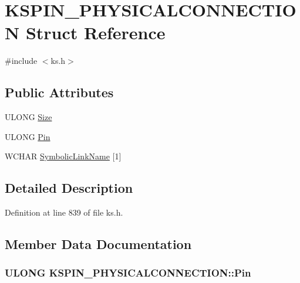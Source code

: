 \hypertarget{struct_k_s_p_i_n___p_h_y_s_i_c_a_l_c_o_n_n_e_c_t_i_o_n}{}\section{K\+S\+P\+I\+N\+\_\+\+P\+H\+Y\+S\+I\+C\+A\+L\+C\+O\+N\+N\+E\+C\+T\+I\+ON Struct Reference}
\label{struct_k_s_p_i_n___p_h_y_s_i_c_a_l_c_o_n_n_e_c_t_i_o_n}


{\ttfamily \#include $<$ks.\+h$>$}

\subsection*{Public Attributes}
\begin{DoxyCompactItemize}
\item 
U\+L\+O\+NG \hyperlink{struct_k_s_p_i_n___p_h_y_s_i_c_a_l_c_o_n_n_e_c_t_i_o_n_a4108d9b16615bd5d9beedaa8974c49a8}{Size}
\item 
U\+L\+O\+NG \hyperlink{struct_k_s_p_i_n___p_h_y_s_i_c_a_l_c_o_n_n_e_c_t_i_o_n_adefc2838105d64b41dfd3fe524b2898c}{Pin}
\item 
W\+C\+H\+AR \hyperlink{struct_k_s_p_i_n___p_h_y_s_i_c_a_l_c_o_n_n_e_c_t_i_o_n_abfc0094a85674a0a8d6bfd943b83cbb7}{Symbolic\+Link\+Name} \mbox{[}1\mbox{]}
\end{DoxyCompactItemize}


\subsection{Detailed Description}


Definition at line 839 of file ks.\+h.



\subsection{Member Data Documentation}
\subsubsection[{\texorpdfstring{Pin}{Pin}}]{\setlength{\rightskip}{0pt plus 5cm}U\+L\+O\+NG K\+S\+P\+I\+N\+\_\+\+P\+H\+Y\+S\+I\+C\+A\+L\+C\+O\+N\+N\+E\+C\+T\+I\+O\+N\+::\+Pin}\hypertarget{struct_k_s_p_i_n___p_h_y_s_i_c_a_l_c_o_n_n_e_c_t_i_o_n_adefc2838105d64b41dfd3fe524b2898c}{}\label{struct_k_s_p_i_n___p_h_y_s_i_c_a_l_c_o_n_n_e_c_t_i_o_n_adefc2838105d64b41dfd3fe524b2898c}


